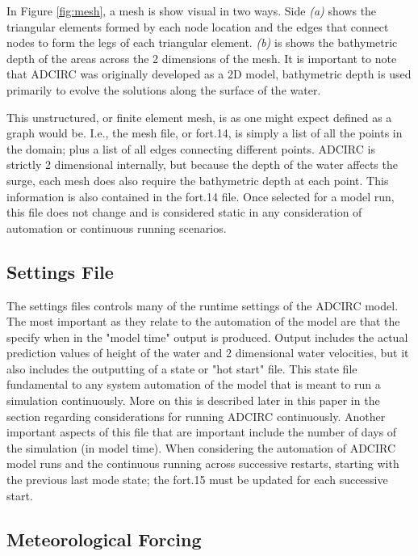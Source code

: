 \documentclass{article}
\begin{document}
In Figure \ref{fig:mesh}, a mesh is show visual in two ways. Side \textit{(a)}
shows the triangular elements formed by each node location and the edges that
connect nodes to form the legs of each triangular element. \textit{(b)} is shows
the bathymetric depth of the areas across the 2 dimensions of the mesh. It is
important to note that ADCIRC was originally developed as a 2D model, bathymetric
depth is used primarily to evolve the solutions along the surface of the water.

This unstructured, or finite element mesh, is as one might expect defined as a
graph would be. I.e., the mesh file, or fort.14, is simply a list of all the
points in the domain; plus a list of all edges connecting different points.
ADCIRC is strictly 2 dimensional internally, but because the depth of the water
affects the surge, each mesh does also require the bathymetric depth at each
point. This information is also contained in the fort.14 file.  Once selected
for a model run, this file does not change and is considered static in any
consideration of automation or continuous running scenarios.

\subsection{Settings File}

The settings files controls many of the runtime settings of the ADCIRC model.
The most important as they relate to the automation of the model are that the
specify when in the "model time" output is produced. Output includes the actual
prediction values of height of the water and 2 dimensional water velocities, but
it also includes the outputting of a state or "hot start" file. This state file
fundamental to any system automation of the model that is meant to run a
simulation continuously. More on this is described later in this paper in the
section regarding considerations for running ADCIRC continuously. Another
important aspects of this file that are important include the number of days of
the simulation (in model time).  When considering the automation of ADCIRC model
runs and the continuous running across successive restarts, starting with the
previous last mode state; the fort.15 must be updated for each successive start.

\subsection{Meteorological Forcing}
\end{document}
